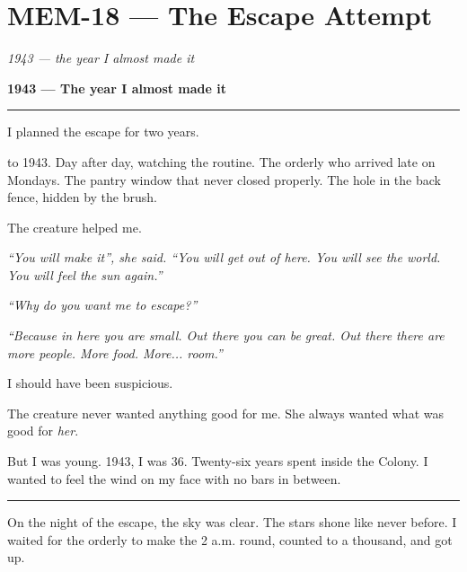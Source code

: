 \section*{\textbf{MEM-18} --- The Escape Attempt}

\noindent \textit{1943 --- the year I almost made it}

\noindent \textbf{1943 --- The year I almost made it}

\vspace{0.5em}\noindent\rule{\textwidth}{0.5pt}\vspace{0.5em}

\noindent I planned the escape for two years.

 to 1943. Day after day, watching the routine. The orderly who arrived late on Mondays. The pantry window that never closed properly. The hole in the back fence, hidden by the brush.

\noindent The creature helped me.

\noindent \textit{\textquotedblleft{}You will make it\textquotedblright{}\textit{, she said. }\textquotedblleft{}You will get out of here. You will see the world. You will feel the sun again.\textquotedblright{}}

\noindent \textit{\textquotedblleft{}Why do you want me to escape?\textquotedblright{}}

\noindent \textit{\textquotedblleft{}Because in here you are small. Out there you can be great. Out there there are more people. More food. More... room.\textquotedblright{}}

\noindent I should have been suspicious.

\noindent The creature never wanted anything good for me.
She always wanted what was good for \textit{her}.

\noindent But I was young. 1943, I was 36. Twenty-six years spent inside the Colony. I wanted to feel the wind on my face with no bars in between.

\vspace{0.5em}\noindent\rule{\textwidth}{0.5pt}\vspace{0.5em}

\noindent On the night of the escape, the sky was clear. The stars shone like never before. I waited for the orderly to make the 2 a.m. round, counted to a thousand, and got up.

